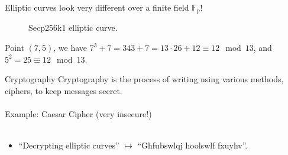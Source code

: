 \documentclass{beamer}
\begin{document}
\begin{frame}
	Elliptic curves look very different over a finite field $\mathbb{F}_{p}$!
	\begin{figure}%
		\centering
		\qquad
		\caption{Secp256k1 elliptic curve.}%
	\end{figure}
	Point $(7,5)$, we have $7^{3} + 7 = 343 + 7 = 13 \cdot 26 + 12 \equiv 12 \mod 13$, and $5^{2} = 25 \equiv 12 \mod 13$.
\end{frame}

\begin{frame}[t]{Cryptography}
	Cryptography is the process of writing using various methods, ciphers, to keep messages secret. \\~\\
	
	Example: Caesar Cipher (very insecure!) \\~\\
	\begin{itemize}
		\item ``Decrypting elliptic curves'' $\mapsto$ ``Ghfubswlqj hoolswlf fxuyhv''.
	\end{itemize}
\end{frame}
\end{document}
